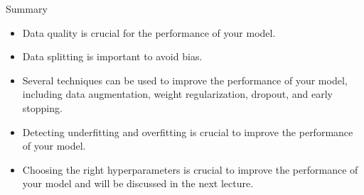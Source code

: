 \documentclass[9pt, aspectratio=169]{beamer}
\begin{document}
\begin{frame}
    {Summary}
    \begin{itemize}
        \item Data quality is crucial for the performance of your model.
        \item Data splitting is important to avoid bias.
        \item Several techniques can be used to improve the performance of your model, including data augmentation, weight regularization, dropout, and early stopping.
        \item Detecting underfitting and overfitting is crucial to improve the performance of your model.
        \item Choosing the right hyperparameters is crucial to improve the performance of your model and will be discussed in the next lecture.
    \end{itemize}
\end{frame}
\end{document}
